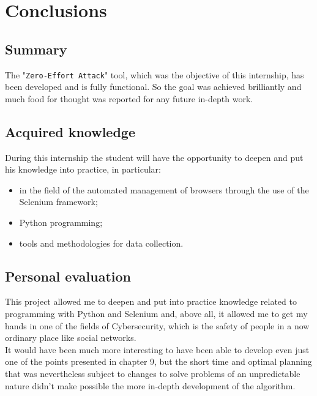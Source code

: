 
\chapter{Conclusions}
\label{cap:conclusions}
\section{Summary}
The "\texttt{Zero-Effort Attack}" tool, which was the objective of this internship, has been developed and is fully functional. So the goal was achieved brilliantly and much food for thought was reported for any future in-depth work.
\section{Acquired knowledge}
During this internship the student will have the opportunity to deepen and put his knowledge into practice, in particular:
\begin{itemize}
	\item in the field of the automated management of browsers through the use of the Selenium framework;
	\item Python programming;
	\item tools and methodologies for data collection.
\end{itemize}
\section{Personal evaluation}
This project allowed me to deepen and put into practice knowledge related to programming with Python and Selenium and, above all, it allowed me to get my hands in one of the fields of Cybersecurity, which is the safety of people in a now ordinary place like social networks.\\
It would have been much more interesting to have been able to develop even just one of the points presented in chapter 9, but the short time and optimal planning that was nevertheless subject to changes to solve problems of an unpredictable nature didn't make possible the more in-depth development of the algorithm.